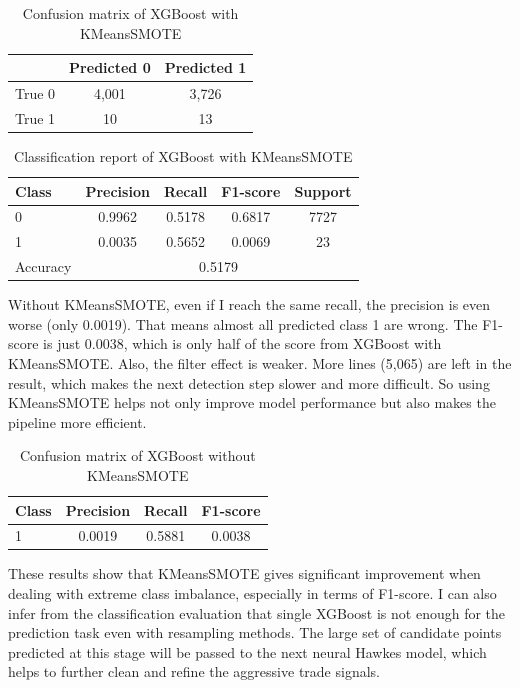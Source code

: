 \begin{table}[H]
    \centering
    \caption{Confusion matrix of XGBoost with KMeansSMOTE}
    \label{tab:xgb-confusion-km}
    \begin{tabular}{lcc}
        \toprule
        & Predicted 0 & Predicted 1 \\
        \midrule
        True 0 & 4,001 & 3,726 \\
        True 1 & 10 & 13 \\
        \bottomrule
    \end{tabular}
\end{table}
\begin{table}[H]
    \centering
    \caption{Classification report of XGBoost with KMeansSMOTE}
    \label{tab:xgb-classification-report-km}
    \begin{tabular}{lcccc}
        \toprule
        Class & Precision & Recall & F1-score & Support \\
        \midrule
        0 & 0.9962 & 0.5178 & 0.6817 & 7727 \\
        1 & 0.0035 & 0.5652 & 0.0069 & 23 \\
        \midrule
        Accuracy & \multicolumn{4}{c}{0.5179} \\
        \bottomrule
    \end{tabular}
\end{table}
\newpage
Without KMeansSMOTE, even if I reach the same recall, the precision is even worse (only 0.0019). That means almost all predicted class 1 are wrong. The F1-score is just 0.0038, which is only half of the score from XGBoost with KMeansSMOTE. Also, the filter effect is weaker. More lines (5,065) are left in the result, which makes the next detection step slower and more difficult. So using KMeansSMOTE helps not only improve model performance but also makes the pipeline more efficient.

\begin{table}[H]
    \centering
    \caption{Confusion matrix of XGBoost without KMeansSMOTE}
    \label{tab:xgb-noKM}
    \begin{tabular}{lccc}
        \toprule
        Class & Precision & Recall & F1-score\\
        \midrule
        1 & 0.0019 & 0.5881 & 0.0038 \\        
        \bottomrule
    \end{tabular}
\end{table}

These results show that KMeansSMOTE gives significant improvement when dealing with extreme class imbalance, especially in terms of F1-score. I can also infer from the classification evaluation that single XGBoost is not enough for the prediction task even with resampling methods. The large set of candidate points predicted at this stage will be passed to the next neural Hawkes model, which helps to further clean and refine the aggressive trade signals. 

